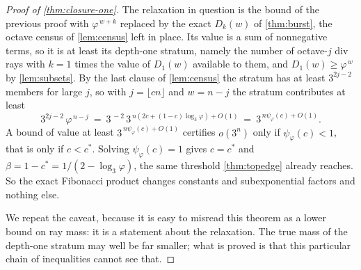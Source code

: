 \documentclass[11pt]{amsart}
\theoremstyle{definition}
\theoremstyle{remark}
\begin{document}
\begin{proof}[Proof of \cref{thm:closure-one}]
The relaxation in question is the bound of the previous proof with $\varphi^{\,w+k}$ replaced by the exact $D_k(w)$ of \cref{thm:burst}, the octave census of \cref{lem:census} left in place. Its value is a sum of nonnegative terms, so it is at least its depth-one stratum, namely the number of octave-$j$ div rays with $k=1$ times the value of $D_1(w)$ available to them, and $D_1(w) \ge \varphi^{\,w}$ by \cref{lem:subsets}. By the last clause of \cref{lem:census} the stratum has at least $3^{2j-2}$ members for large $j$, so with $j = \lfloor cn \rfloor$ and $w = n-j$ the stratum contributes at least
\[
  3^{2j-2}\, \varphi^{\,n-j} \ = \ 3^{\,-2}\,3^{\,n(2c + (1-c)\log_3\varphi) + O(1)} \ = \ 3^{\,n \psi_\varphi(c) + O(1)} .
\]
A bound of value at least $3^{\,n\psi_\varphi(c)+O(1)}$ certifies $o(3^n)$ only if $\psi_\varphi(c) < 1$, that is only if $c < c^*$. Solving $\psi_\varphi(c) = 1$ gives $c = c^*$ and $\beta = 1 - c^* = 1/(2 - \log_3\varphi)$, the same threshold \cref{thm:topedge} already reaches. So the exact Fibonacci product changes constants and subexponential factors and nothing else.

We repeat the caveat, because it is easy to misread this theorem as a lower bound on ray mass: it is a statement about the relaxation. The true mass of the depth-one stratum may well be far smaller; what is proved is that this particular chain of inequalities cannot see that.
\end{proof}
\end{document}
